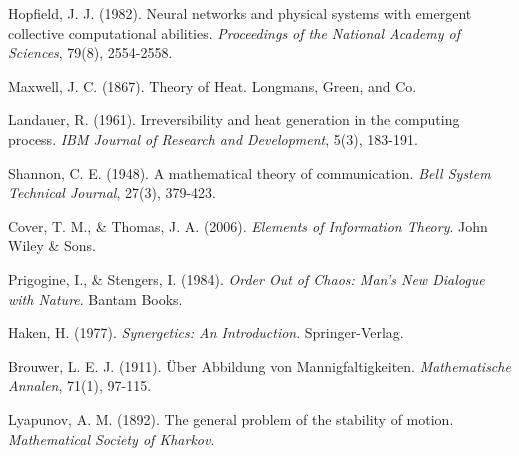 \documentclass[12pt,a4paper]{article}
\begin{document}

\begin{thebibliography}{99}

Hopfield, J. J. (1982). Neural networks and physical systems with emergent collective computational abilities. \textit{Proceedings of the National Academy of Sciences}, 79(8), 2554-2558.

Maxwell, J. C. (1867). Theory of Heat. Longmans, Green, and Co.

Landauer, R. (1961). Irreversibility and heat generation in the computing process. \textit{IBM Journal of Research and Development}, 5(3), 183-191.

Shannon, C. E. (1948). A mathematical theory of communication. \textit{Bell System Technical Journal}, 27(3), 379-423.

Cover, T. M., \& Thomas, J. A. (2006). \textit{Elements of Information Theory}. John Wiley \& Sons.

Prigogine, I., \& Stengers, I. (1984). \textit{Order Out of Chaos: Man's New Dialogue with Nature}. Bantam Books.

Haken, H. (1977). \textit{Synergetics: An Introduction}. Springer-Verlag.

Brouwer, L. E. J. (1911). Über Abbildung von Mannigfaltigkeiten. \textit{Mathematische Annalen}, 71(1), 97-115.

Lyapunov, A. M. (1892). The general problem of the stability of motion. \textit{Mathematical Society of Kharkov}.

\end{thebibliography}
\end{document}
